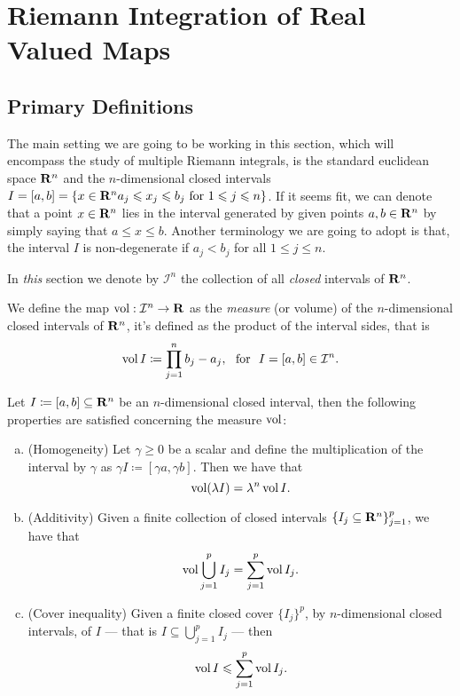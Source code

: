 \section{Riemann Integration of Real Valued Maps}

\subsection{Primary Definitions}

The main setting we are going to be working in this section, which will
encompass the study of multiple Riemann integrals, is the standard euclidean
space \(\mathbf{R}^n\) and the \(n\)-dimensional closed intervals \(I = [a, b] = \{x \in
\mathbf{R}^n \relax a_j \leqslant x_j \leqslant b_j \text{ for } 1 \leqslant j \leqslant n\}\). If it seems fit,
we can denote that a point \(x \in \mathbf{R}^n\) lies in the interval generated by
given points \(a, b \in \mathbf{R}^n\) by simply saying that \(a \leq x \leq
b\). Another terminology we are going to adopt is that, the interval \(I\) is
non-degenerate if \(a_j < b_j\) for all \(1 \leq j \leq n\).

\begin{notation}
In \emph{this} section we denote by \(\mathcal I^n\) the collection of all
\emph{closed} intervals of \(\mathbf{R}^n\).
\end{notation}

\begin{definition}
\label{def:interval-measure}
We define the map \(\operatorname{vol}: \mathcal I^n \to \mathbf{R}\) as the \emph{measure} (or
volume) of the \(n\)-dimensional closed intervals of \(\mathbf{R}^n\), it's defined as
the product of the interval sides, that is
\[
  \operatorname{vol} I \coloneq \prod_{j=1}^n b_j - a_j,
  \ \text{ for }\ I = [a, b] \in \mathcal I^n.
\]
\end{definition}

\begin{corollary}
\label{cor:interval-measure-properties}
Let \(I \coloneq [a, b] \subseteq \mathbf{R}^n\) be an \(n\)-dimensional closed
interval, then the following properties are satisfied concerning the measure
\(\operatorname{vol}\):
\begin{enumerate}[(a)]\setlength\itemsep{0em}
\item (Homogeneity) Let \(\gamma \geq 0\) be a scalar and define the
  multiplication of the interval by \(\gamma\) as \(\gamma I \coloneq [\gamma
  a, \gamma b]\). Then we have that
  \[
    \operatorname{vol}(\lambda I) = \lambda^n \operatorname{vol} I.
  \]
\item (Additivity) Given a finite collection of closed intervals \(\{I_{j}
  \subseteq \mathbf{R}^n\}_{j = 1}^p\), we have that
  \[
    \operatorname{vol} \bigcup_{j=1}^p I_j = \sum_{j=1}^p \operatorname{vol} I_j.
  \]
\item (Cover inequality) Given a finite closed cover \(\{I_{j}\}^{p}\), by
  \(n\)-dimensional closed intervals, of \(I\) --- that is \(I \subseteq
  \bigcup_{j=1}^p I_j\) --- then
  \[
    \operatorname{vol} I \leqslant \sum_{j=1}^p \operatorname{vol} I_j.
  \]
\end{enumerate}
\end{corollary}

